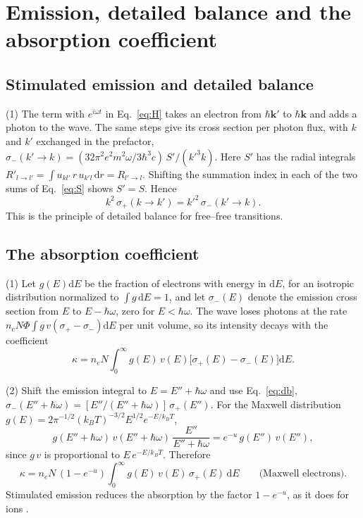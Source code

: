 \documentclass[11pt]{article}
\numberwithin{equation}{section}
\newcommand{\kv}{\mathbf k}
\newcommand{\dd}{\mathrm d}
\newcommand{\kB}{k_B}
\begin{document}
\section{Emission, detailed balance and the absorption coefficient}
\label{sec:detailed}

\subsection{Stimulated emission and detailed balance}
{\noindent}(1) The term with $e^{i\omega t}$ in Eq.~\eqref{eq:H} takes an
electron from $\hbar\kv'$ to $\hbar\kv$ and adds a photon to the wave. The
same steps give its cross section per photon flux, with $k$ and $k'$
exchanged in the prefactor,
$\sigma_-(k'\to k)=(32\pi^2e^2m^2\omega/3\hbar^3c)\,S'/(k'^3k)$. Here $S'$ has
the radial integrals $R'_{l\to l'}=\int u_{kl'}\,r\,u_{k'l}\,\dd r=R_{l'\to l}$.
Shifting the summation index in each of the two sums of Eq.~\eqref{eq:S}
shows $S'=S$. Hence
\begin{equation}
\boxed{\;k^2\,\sigma_+(k\to k')=k'^2\,\sigma_-(k'\to k).\;}
\label{eq:db}
\end{equation}
This is the principle of detailed balance for free--free transitions.

\subsection{The absorption coefficient}
{\noindent}(1) Let $g(E)\dd E$ be the fraction of electrons with energy in
$\dd E$, for an isotropic distribution normalized to $\int g\,\dd E=1$, and
let $\sigma_-(E)$ denote the emission cross section from $E$ to $E-\hbar\omega$,
zero for $E<\hbar\omega$. The wave loses photons at the rate
$n_eN\Phi\int g\,v(\sigma_+-\sigma_-)\dd E$ per unit volume, so its intensity
decays with the coefficient
\begin{equation}
\boxed{\;\kappa=n_eN\int_0^\infty g(E)\,v(E)\big[\sigma_+(E)-\sigma_-(E)\big]\dd E .\;}
\label{eq:kappa-gen}
\end{equation}

{\noindent}(2) Shift the emission integral to $E=E''+\hbar\omega$ and use
Eq.~\eqref{eq:db}, $\sigma_-(E''+\hbar\omega)=[E''/(E''+\hbar\omega)]\,\sigma_+(E'')$.
For the Maxwell distribution
$g(E)=2\pi^{-1/2}(\kB T)^{-3/2}E^{1/2}e^{-E/\kB T}$,
\begin{equation}
g(E''+\hbar\omega)\,v(E''+\hbar\omega)\,\frac{E''}{E''+\hbar\omega}
=e^{-u}\,g(E'')\,v(E''),
\end{equation}
since $g\,v$ is proportional to $E\,e^{-E/\kB T}$. Therefore
\begin{equation}
\boxed{\;\kappa=n_eN\,(1-e^{-u})\int_0^\infty g(E)\,v(E)\,\sigma_+(E)\,\dd E
\qquad\text{(Maxwell electrons)}.\;}
\label{eq:kappa-mb}
\end{equation}
Stimulated emission reduces the absorption by the factor $1-e^{-u}$, as it
does for ions \cite{KarzasLatter1961}.
\end{document}
